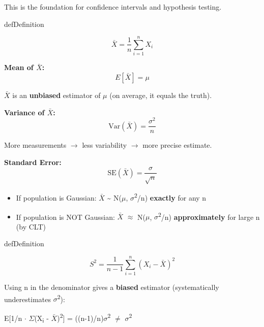 This is the foundation for confidence intervals and hypothesis testing.


\begin{PSbox}[unbreakable]{def}{Definition}

\[\bar{X} = \frac{1}{n}\sum_{i=1}^n X_i\]

\end{PSbox}


\textbf{Mean of \ensuremath{\bar{X}}:}\PSbr{}\[E[\bar{X}] = \mu\]

\ensuremath{\bar{X}} is an \textbf{unbiased} estimator of \ensuremath{\mu} (on average, it equals the truth).

\textbf{Variance of \ensuremath{\bar{X}}:}\PSbr{}\[\text{Var}(\bar{X}) = \frac{\sigma^2}{n}\]

More measurements \ensuremath{\to} less variability \ensuremath{\to} more precise estimate.

\textbf{Standard Error:}\PSbr{}\[\text{SE}(\bar{X}) = \frac{\sigma}{\sqrt{n}}\]


\begin{itemize}
\tightlist
\item
  If population is Gaussian: \ensuremath{\bar{X}} \textasciitilde{} N(\ensuremath{\mu}, \ensuremath{\sigma}\textsuperscript{2}/n) \textbf{exactly} for any n
\item
  If population is NOT Gaussian: \ensuremath{\bar{X}} \ensuremath{\approx} N(\ensuremath{\mu}, \ensuremath{\sigma}\textsuperscript{2}/n) \textbf{approximately} for large n (by CLT)
\end{itemize}


\begin{PSbox}[unbreakable]{def}{Definition}

\[S^2 = \frac{1}{n-1}\sum_{i=1}^n (X_i - \bar{X})^2\]

\end{PSbox}


Using n in the denominator gives a \textbf{biased} estimator (systematically underestimates \ensuremath{\sigma}\textsuperscript{2}):

E[1/n \ensuremath{\cdot} \ensuremath{\Sigma}(X\textsubscript{i} - \ensuremath{\bar{X}})\textsuperscript{2}] = ((n-1)/n)\ensuremath{\sigma}\textsuperscript{2} \ensuremath{\neq} \ensuremath{\sigma}\textsuperscript{2}


